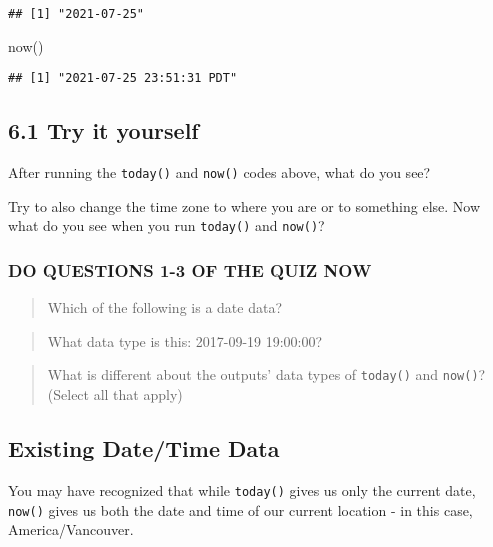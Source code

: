 \documentclass[
]{book}
\newenvironment{Shaded}{\begin{snugshade}}{\end{snugshade}}
\newcommand{\FunctionTok}[1]{\textcolor[rgb]{0.00,0.00,0.00}{#1}}
\newcommand{\NormalTok}[1]{#1}
\begin{document}
\begin{verbatim}
## [1] "2021-07-25"
\end{verbatim}

\begin{Shaded}
\begin{Highlighting}[]
\FunctionTok{now}\NormalTok{()}
\end{Highlighting}
\end{Shaded}

\begin{verbatim}
## [1] "2021-07-25 23:51:31 PDT"
\end{verbatim}

\hypertarget{try-it-yourself-28}{%
\subsection{6.1 Try it yourself}\label{try-it-yourself-28}}

After running the \texttt{today()} and \texttt{now()} codes above, what do you see?

Try to also change the time zone to where you are or to something else. Now what do you see when you run \texttt{today()} and \texttt{now()}?

\hypertarget{do-questions-1-3-of-the-quiz-now}{%
\subsubsection{DO QUESTIONS 1-3 OF THE QUIZ NOW}\label{do-questions-1-3-of-the-quiz-now}}

\begin{quote}
Which of the following is a date data?
\end{quote}

\begin{quote}
What data type is this: 2017-09-19 19:00:00?
\end{quote}

\begin{quote}
What is different about the outputs' data types of \texttt{today()} and \texttt{now()}? (Select all that apply)
\end{quote}

\hypertarget{existing-datetime-data}{%
\subsection{Existing Date/Time Data}\label{existing-datetime-data}}

You may have recognized that while \texttt{today()} gives us only the current date, \texttt{now()} gives us both the date and time of our current location - in this case, America/Vancouver.
\end{document}
